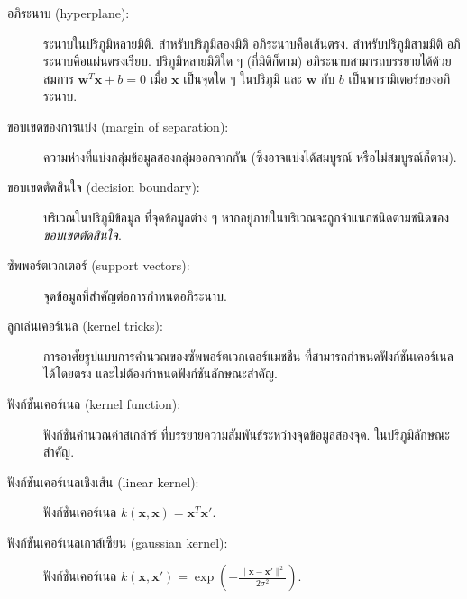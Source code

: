 \begin{description}
\item[อภิระนาบ (hyperplane):]
ระนาบในปริภูมิหลายมิติ.
สำหรับปริภูมิสองมิติ {อภิระนาบ}คือเส้นตรง.
สำหรับปริภูมิสามมิติ {อภิระนาบ}คือแผ่นตรงเรียบ.
ปริภูมิหลายมิติใด ๆ (กี่มิติก็ตาม) {อภิระนาบ}สามารถบรรยายได้ด้วยสมการ $\bm{w}^T \bm{x} + b = 0$ 
เมื่อ $\bm{x}$ เป็นจุดใด ๆ ในปริภูมิ และ $\bm{w}$ กับ $b$ เป็นพารามิเตอร์ของอภิระนาบ.
	
\item[ขอบเขตของการแบ่ง (margin of separation):]
ความห่างที่แบ่งกลุ่มข้อมูลสองกลุ่มออกจากกัน (ซึ่งอาจแบ่งได้สมบูรณ์ หรือไม่สมบูรณ์ก็ตาม).

\item[ขอบเขตตัดสินใจ (decision boundary):]
บริเวณในปริภูมิข้อมูล ที่จุดข้อมูลต่าง ๆ หากอยู่ภายในบริเวณจะถูกจำแนกชนิดตามชนิดของ\textit{ขอบเขตตัดสินใจ}.


\item[ซัพพอร์ตเวกเตอร์ (support vectors):]
จุดข้อมูลที่สำคัญต่อการกำหนดอภิระนาบ.

\item[ลูกเล่นเคอร์เนล (kernel tricks):]
การอาศัยรูปแบบการคำนวณของซัพพอร์ตเวกเตอร์แมชชีน
ที่สามารถกำหนดฟังก์ชันเคอร์เนลได้โดยตรง และไม่ต้องกำหนดฟังก์ชันลักษณะสำคัญ.

\item[ฟังก์ชันเคอร์เนล (kernel function):]
ฟังก์ชันคำนวณค่าสเกล่าร์ ที่บรรยายความสัมพันธ์ระหว่างจุดข้อมูลสองจุด. 
ในปริภูมิลักษณะสำคัญ.

\item[ฟังก์ชันเคอร์เนลเชิงเส้น (linear kernel):]
ฟังก์ชันเคอร์เนล $k(\bm{x}, \bm{x}) = \bm{x}^T \bm{x}'$.

\item[ฟังก์ชันเคอร์เนลเกาส์เซียน (gaussian kernel):]
ฟังก์ชันเคอร์เนล $k(\bm{x}, \bm{x}') = \exp\left( -\frac{\|\bm{x} - \bm{x}'\|^2}{2 \sigma^2}\right)$.
	
	
\end{description}


